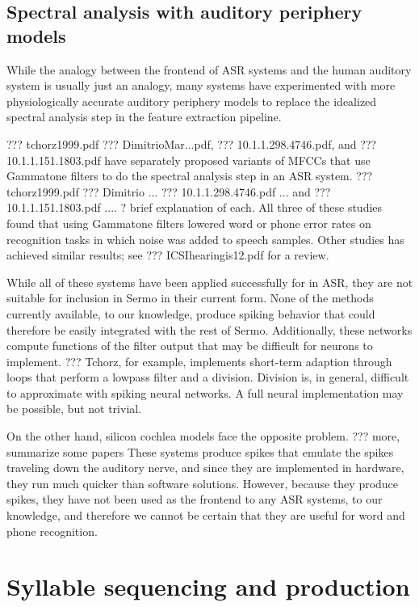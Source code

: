 \subsection{Spectral analysis with auditory periphery models}

While the analogy
between the frontend of ASR systems
and the human auditory system
is usually just an analogy,
many systems have experimented with
more physiologically accurate
auditory periphery models
to replace the idealized spectral analysis step
in the feature extraction pipeline.

??? tchorz1999.pdf
??? DimitrioMar...pdf,
??? 10.1.1.298.4746.pdf,
and ??? 10.1.1.151.1803.pdf
have separately proposed variants of MFCCs
that use Gammatone filters
to do the spectral analysis step in an ASR system.
??? tchorz1999.pdf
??? Dimitrio ...
??? 10.1.1.298.4746.pdf ...
and ??? 10.1.1.151.1803.pdf .... ? brief explanation of each.
All three of these studies
found that using Gammatone filters
lowered word or phone error rates
on recognition tasks in which
noise was added to speech samples.
Other studies has achieved similar results;
see ??? ICSIhearingis12.pdf for a review.

While all of these systems
have been applied successfully
for in ASR,
they are not suitable
for inclusion in Sermo in their current form.
None of the methods currently available,
to our knowledge, produce spiking behavior
that could therefore
be easily integrated with the rest of Sermo.
Additionally, these networks compute
functions of the filter output that
may be difficult for neurons to implement.
??? Tchorz, for example,
implements short-term adaption
through loops that perform
a lowpass filter and a division.
Division is, in general,
difficult to approximate with spiking neural networks.
A full neural implementation
may be possible,
but not trivial.

On the other hand,
silicon cochlea models face the opposite problem.
??? more, summarize some papers
These systems produce spikes
that emulate the spikes
traveling down the auditory nerve,
and since they are implemented in hardware,
they run much quicker than software solutions.
However, because they produce spikes,
they have not been used
as the frontend to any ASR systems,
to our knowledge,
and therefore we cannot
be certain that they are useful
for word and phone recognition.

\section{Syllable sequencing and production}

